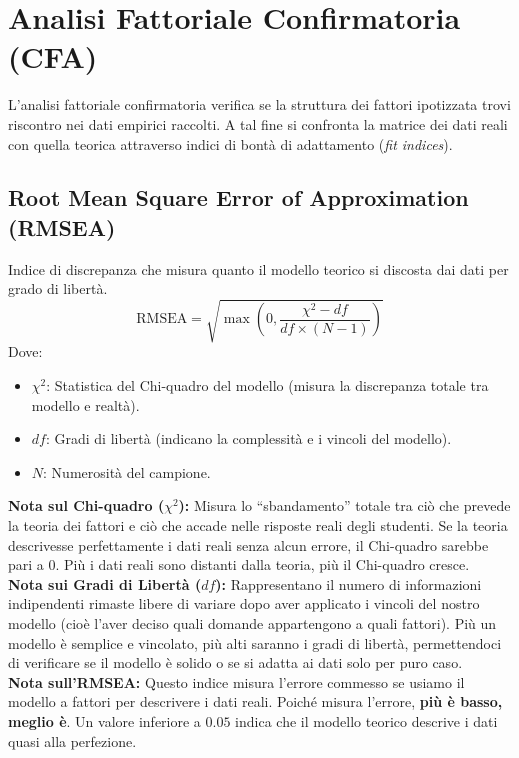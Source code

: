 \documentclass[11pt,a4paper]{article}
\begin{document}
\section{Analisi Fattoriale Confirmatoria (CFA)}

L'analisi fattoriale confirmatoria verifica se la struttura dei fattori ipotizzata trovi riscontro nei dati empirici raccolti. A tal fine si confronta la matrice dei dati reali con quella teorica attraverso indici di bontà di adattamento (\textit{fit indices}).

\subsection{Root Mean Square Error of Approximation (RMSEA)}
Indice di discrepanza che misura quanto il modello teorico si discosta dai dati per grado di libertà.
\begin{equation}
\text{RMSEA} = \sqrt{\max\left(0, \frac{\chi^2 - df}{df \times (N - 1)}\right)}
\end{equation}
Dove:
\begin{itemize}
    \item $\chi^2$: Statistica del Chi-quadro del modello (misura la discrepanza totale tra modello e realtà).
    \item $df$: Gradi di libertà (indicano la complessità e i vincoli del modello).
    \item $N$: Numerosità del campione.
\end{itemize}
\textbf{Nota sul Chi-quadro ($\chi^2$):} Misura lo ``sbandamento'' totale tra ciò che prevede la teoria dei fattori e ciò che accade nelle risposte reali degli studenti. Se la teoria descrivesse perfettamente i dati reali senza alcun errore, il Chi-quadro sarebbe pari a $0$. Più i dati reali sono distanti dalla teoria, più il Chi-quadro cresce.
\\
\textbf{Nota sui Gradi di Libertà ($df$):} Rappresentano il numero di informazioni indipendenti rimaste libere di variare dopo aver applicato i vincoli del nostro modello (cioè l'aver deciso quali domande appartengono a quali fattori). Più un modello è semplice e vincolato, più alti saranno i gradi di libertà, permettendoci di verificare se il modello è solido o se si adatta ai dati solo per puro caso.
\\
\textbf{Nota sull'RMSEA:} Questo indice misura l'errore commesso se usiamo il modello a fattori per descrivere i dati reali. Poiché misura l'errore, \textbf{più è basso, meglio è}. Un valore inferiore a $0.05$ indica che il modello teorico descrive i dati quasi alla perfezione.
\end{document}
